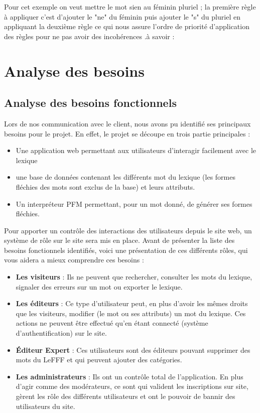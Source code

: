\documentclass[12pt,a4paper]{article}
\begin{document}
Pour cet exemple on veut mettre le mot sien au féminin pluriel ; la première règle à appliquer c'est d'ajouter le "ne" du féminin puis ajouter le "s" du pluriel en appliquant la deuxième règle ce qui nous assure l'ordre de priorité d'application des règles pour ne pas avoir des incohérences .à savoir \cite{PFM} :

\section{Analyse des besoins}
\subsection{Analyse des besoins fonctionnels}
\smallbreak Lors de nos communication avec le client, nous avons pu identifié ses principaux besoins pour le projet. En effet, le projet se découpe en trois partie principales : 
\begin{itemize}  
  \item Une application web permettant aux utilisateurs d'interagir facilement avec le lexique
  \item une base de données contenant les différents mot du lexique (les formes fléchies des mots sont exclus de la base) et leurs attributs.
  \item Un interpréteur PFM permettant, pour un mot donné, de générer ses formes fléchies.
\end{itemize}

\smallbreak Pour apporter un contrôle des interactions des utilisateurs depuis le site web, un système de rôle sur le site sera mis en place. Avant de présenter la liste des besoins fonctionnels identifiés, voici une présentation de ces différents rôles, qui vous aidera a mieux comprendre ces besoins : 
\begin{itemize}  
  \item \textbf{Les visiteurs} : Ils ne peuvent que rechercher, consulter les mots du lexique, signaler des erreurs sur un mot ou exporter le lexique.
  \item \textbf{Les éditeurs} : Ce type d'utilisateur peut, en plus d'avoir les mêmes droits que les visiteurs, modifier (le mot ou ses attributs) un mot du lexique. Ces actions ne peuvent être effectué qu'en étant connecté (système d'authentification) sur le site.
  \item \textbf{Éditeur Expert} :  Ces utilisateurs sont des éditeurs pouvant supprimer des mots du LeFFF et qui peuvent ajouter des catégories.
  \item \textbf{Les administrateurs} : Ils ont un contrôle total de l'application. En plus d'agir comme des modérateurs, ce sont qui valident les inscriptions sur site, gèrent les rôle des différents utilisateurs et ont le pouvoir de bannir des utilisateurs du site.
\end{itemize}
\end{document}
